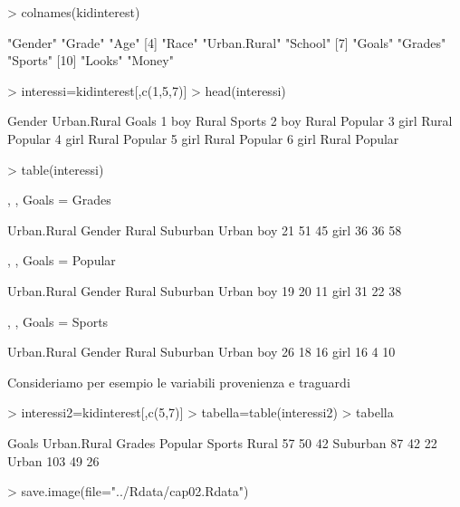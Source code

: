\documentclass[onecolumn,11pt]{book}
\begin{document}
\begin{Schunk}
\begin{Sinput}
> colnames(kidinterest)
\end{Sinput}
\begin{Soutput}
 [1] "Gender"      "Grade"       "Age"        
 [4] "Race"        "Urban.Rural" "School"     
 [7] "Goals"       "Grades"      "Sports"     
[10] "Looks"       "Money"      
\end{Soutput}
\begin{Sinput}
> interessi=kidinterest[,c(1,5,7)]
> head(interessi)
\end{Sinput}
\begin{Soutput}
  Gender Urban.Rural   Goals
1    boy       Rural  Sports
2    boy       Rural Popular
3   girl       Rural Popular
4   girl       Rural Popular
5   girl       Rural Popular
6   girl       Rural Popular
\end{Soutput}
\begin{Sinput}
> table(interessi)
\end{Sinput}
\begin{Soutput}
, , Goals = Grades

      Urban.Rural
Gender Rural Suburban Urban
  boy     21       51    45
  girl    36       36    58

, , Goals = Popular

      Urban.Rural
Gender Rural Suburban Urban
  boy     19       20    11
  girl    31       22    38

, , Goals = Sports

      Urban.Rural
Gender Rural Suburban Urban
  boy     26       18    16
  girl    16        4    10
\end{Soutput}
\end{Schunk}
 Consideriamo per esempio le variabili provenienza e traguardi
\begin{Schunk}
\begin{Sinput}
> interessi2=kidinterest[,c(5,7)]
> tabella=table(interessi2)
> tabella
\end{Sinput}
\begin{Soutput}
           Goals
Urban.Rural Grades Popular Sports
   Rural        57      50     42
   Suburban     87      42     22
   Urban       103      49     26
\end{Soutput}
\begin{Sinput}
> save.image(file="../Rdata/cap02.Rdata")
\end{Sinput}
\end{Schunk}
\end{document}
